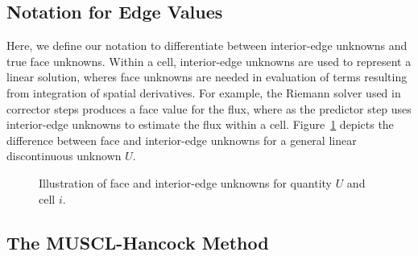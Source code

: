 \documentclass[preprint,12pt]{elsarticle}
\begin{document}
\subsection{Notation for Edge Values}

Here, we define our notation to differentiate between interior-edge unknowns and true face unknowns.  Within a cell, interior-edge unknowns
are used to represent a linear solution, wheres face unknowns are needed in evaluation of
terms resulting from integration of spatial derivatives.  For example, the Riemann solver used
in corrector steps produces a face value for the flux, where as the predictor step uses interior-edge unknowns to estimate the
flux within a cell.  Figure~\ref{fig:face_unknowns} depicts the difference between face
and interior-edge unknowns for a general linear discontinuous unknown $U$.

\begin{figure}
    \centering
    \resizebox{0.50\textwidth}{!}{
        
    }
    \caption{\label{fig:face_unknowns}Illustration of face and interior-edge unknowns for
quantity $U$ and cell $i$.}
\end{figure}


\subsection{The MUSCL-Hancock Method}
\end{document}

